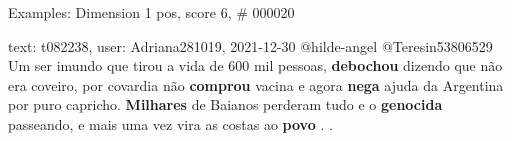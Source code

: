 \begin{frame}{Examples: Dimension 1 pos, score 6, \# 000020}
\footnotesize
\begin{exampleblock}{text: t082238, user: Adriana281019, 2021-12-30}
@hilde-angel @Teresin53806529 Um ser imundo que tirou a vida de 600 mil 
pessoas, \textbf{debochou} dizendo que não era coveiro, por covardia não 
\textbf{comprou} vacina e agora \textbf{nega} ajuda da Argentina por puro 
capricho. \textbf{Milhares} de Baianos perderam tudo e o \textbf{genocida} 
passeando, e mais uma vez vira as costas ao \textbf{povo} . . 
\end{exampleblock}
\end{frame}
